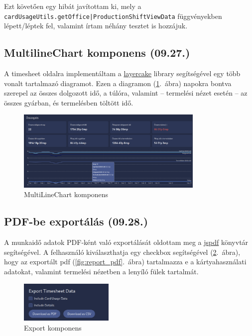 \documentclass[a4paper]{article}
\newcommand{\inlts}[1]{\texttt{#1}}
\begin{document}
Ezt követően egy hibát javítottam ki, mely a
\inlts{cardUsageUtils.getOffice|ProductionShiftViewData} függvényekben lépett/léptek fel,
valamint írtam néhány tesztet is hozzájuk.

\subsection{MultilineChart komponens (09.27.)}

A timesheet oldalra implementáltam a \href{https://layercake.graphics/}{layercake} library segítségével egy több vonalt tartalmazó
diagramot. Ezen a diagramon (\ref{fig:chart}.~ábra) napokra bontva szerepel az összes dolgozott idő, a túlóra, valamint --
termelési nézet esetén -- az összes gyárban, és termelésben töltött idő.

\begin{figure}[ht]
  \centering
  \includegraphics[width = 0.8\textwidth]{images/chart.png}
  \caption{MultiLineChart komponens}
  \label{fig:chart}
\end{figure}

\subsection{PDF-be exportálás (09.28.)}

A munkaidő adatok PDF-ként való exportálását
oldottam meg a \href{https://www.npmjs.com/package/jspdf}{jspdf} könyvtár segítségével. A
felhasználó kiválaszthatja egy checkbox
segítségével (\ref{fig:export_component}.~ábra), hogy az exportált pdf (\ref{fig:report_pdf}.~ábra) tartalmazza e a
kártyahasználati adatokat, valamint termelési
nézetben a lenyíló fülek tartalmát.

\begin{figure}[ht]
  \centering
  \includegraphics[width=0.4\textwidth]{images/export.png}
  \caption{Export komponens}
  \label{fig:export_component}
\end{figure}
\end{document}

